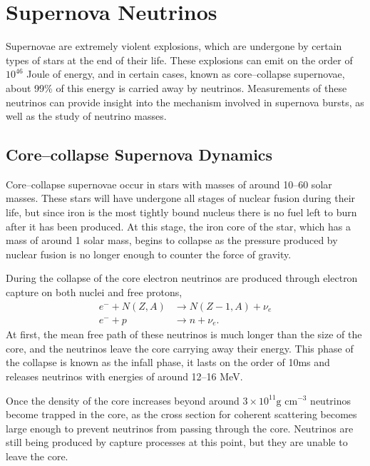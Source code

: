 \section{Supernova Neutrinos} \label{nu_sn}

Supernovae are extremely violent explosions, which are undergone by certain 
types of stars at the end of their life. These explosions can emit on the 
order of $10^{46}$ Joule of energy, and in certain cases, known as 
core--collapse supernovae, about 99\% of this energy is carried away by 
neutrinos.  Measurements of these neutrinos can provide insight into the 
mechanism involved in supernova bursts, as well as the study of neutrino 
masses\cite{GiuntiCarlo2007FoNP}.  

\subsection{Core--collapse Supernova Dynamics}

Core--collapse supernovae occur in stars with masses of around 10--60 solar 
masses. These stars will have undergone all stages of nuclear fusion during
their life, but since iron is the most tightly bound nucleus there is no fuel 
left to burn after it has been produced. At this stage, the iron core of the
star, which has a mass of around 1 solar mass, begins to collapse as the
pressure produced by nuclear fusion is no longer enough to counter the force of
gravity. 

During the collapse of the core electron neutrinos are produced through
electron capture on both nuclei and free protons,
\begin{align*}
	e^- + N(Z, A) &\rightarrow N(Z - 1, A) + \nu_e \\
	e^- + p &\rightarrow n + \nu_e.
\end{align*}
At first, the mean free path of these neutrinos is much longer than the size of
the core, and the neutrinos leave the core carrying away their energy. This phase
of the collapse is known as the infall phase, it lasts on the order of 10ms and
releases neutrinos with energies of around 12--16 MeV.

Once the density of the core increases beyond around 
$3\times10^{11} \mbox{g cm}^{-3}$ neutrinos become trapped in the core, as the 
cross section for coherent scattering becomes large enough to prevent neutrinos
from passing through the core. Neutrinos are still being produced by capture 
processes at this point, but they are unable to leave the core.

